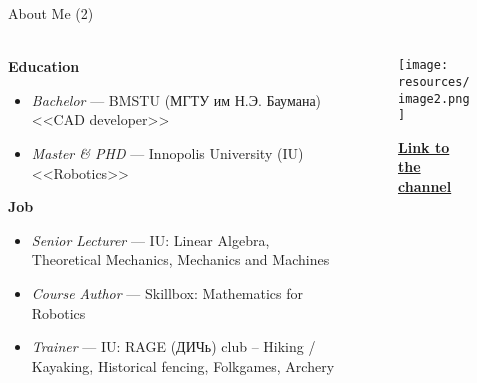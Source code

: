 \documentclass[aspectratio=169,notes]{beamer}
\begin{document}
\begin{frame}[t]{About Me (2)}
    \framesubtitle{}
    \begin{columns}[T,onlytextwidth]
        \begin{column}{0.69\textwidth}
            \textbf{Education}
            \begin{itemize}
                \item \textit{Bachelor} --- BMSTU (МГТУ им Н.Э. Баумана) <<CAD developer>>
                \item \textit{Master \& PHD} --- Innopolis University (IU) <<Robotics>>
            \end{itemize}
            \textbf{Job}
            \begin{itemize}
                \item \textit{Senior Lecturer} --- IU: Linear Algebra, Theoretical Mechanics, Mechanics and Machines
                \item \textit{Course Author} --- Skillbox: Mathematics for Robotics
                \item \textit{Trainer} --- IU: RAGE (ДИЧь) club -- Hiking / Kayaking, Historical fencing, Folkgames, Archery
            \end{itemize}
        \end{column}
        \begin{column}{0.29\textwidth}
            \begin{figure}[H]
                \centering\texttt{[image: resources/image2.png]}
                \caption*{\href{https://t.me/dich_trainings}{\textbf{Link to the channel}}}
                \label{fig:resources/image2.png}
            \end{figure}
        \end{column}
    \end{columns}
\end{frame}
\end{document}

